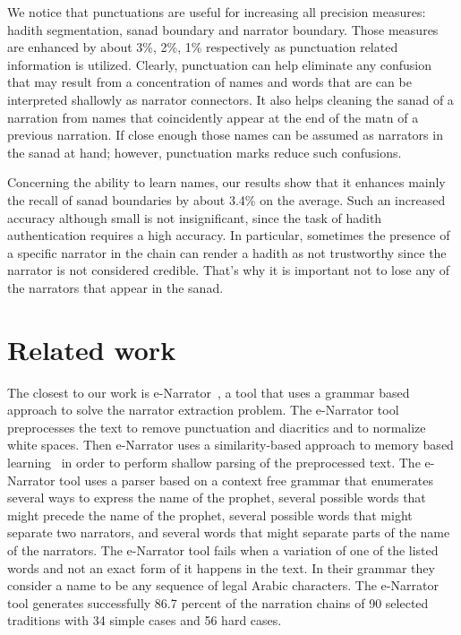 \documentclass[11pt]{article}
\begin{document}
We notice that punctuations are useful for increasing all precision measures: hadith segmentation, sanad boundary and
narrator boundary. Those measures are enhanced by about 3\%, 2\%, 1\% respectively as punctuation related information is 
utilized.  Clearly, punctuation can help eliminate any confusion that may result from a concentration of names and words that are
can be interpreted shallowly as narrator connectors. It also helps cleaning the sanad of a narration from names that coincidently appear at the 
end of the matn of a previous narration. If close enough those names can be assumed as narrators in the sanad at hand; however, punctuation marks
reduce such confusions.

Concerning the ability to learn names, our results show that it enhances mainly the recall of sanad boundaries by about 3.4\% on the average.
Such an increased accuracy although small is not insignificant, since the task of hadith authentication requires a high accuracy. In particular,
sometimes the presence of a specific narrator in the chain can render a hadith as not trustworthy since the narrator is not considered credible.
That's why it is important not to lose any of the narrators that appear in the sanad. 


\section{Related work }
\label{sec:related}

The closest to our work is e-Narrator~\cite{eNarrator}, a 
tool that uses a grammar based approach to solve 
the narrator extraction problem. 
The e-Narrator tool preprocesses the text to remove 
punctuation and diacritics and to normalize white
spaces. 
Then e-Narrator uses a similarity-based approach
to memory based learning~\cite{eNarrator} in order to perform 
shallow parsing of the preprocessed text. 
The e-Narrator tool uses a parser based on a context
free grammar that enumerates several ways to express
the name of the prophet, several possible words that 
might precede the name of the prophet, several possible
words that might separate two narrators, and several
words that might separate parts of the name of the narrators.
The e-Narrator tool fails when a variation of one of the 
listed words and not an exact form of it
happens in the text. 
In their grammar they consider a name to be any sequence of 
legal Arabic characters. 
The e-Narrator tool generates successfully 86.7 percent of
the narration chains of 90 selected traditions with 
34 simple cases and 56 hard cases. 
\end{document}
